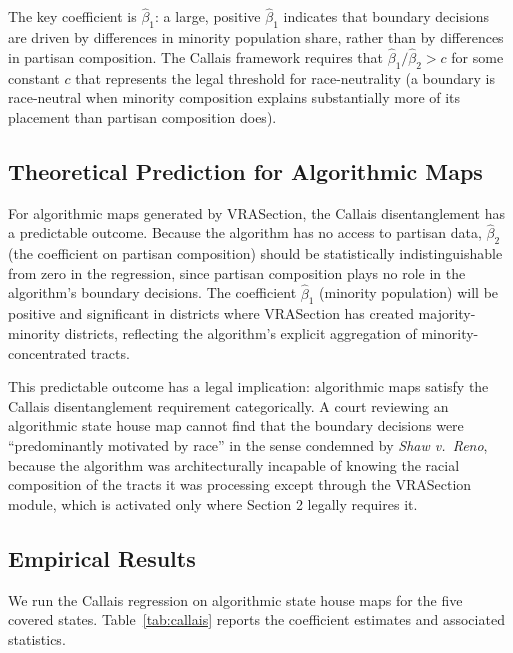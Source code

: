 The key coefficient is $\hat\beta_1$: a large, positive $\hat\beta_1$ indicates that boundary decisions are driven by differences in minority population share, rather than by differences in partisan composition. The Callais framework requires that $\hat\beta_1 / \hat\beta_2 > c$ for some constant $c$ that represents the legal threshold for race-neutrality (a boundary is race-neutral when minority composition explains substantially more of its placement than partisan composition does).

\subsection{Theoretical Prediction for Algorithmic Maps}

For algorithmic maps generated by VRASection, the Callais disentanglement has a predictable outcome. Because the algorithm has no access to partisan data, $\hat\beta_2$ (the coefficient on partisan composition) should be statistically indistinguishable from zero in the regression, since partisan composition plays no role in the algorithm's boundary decisions. The coefficient $\hat\beta_1$ (minority population) will be positive and significant in districts where VRASection has created majority-minority districts, reflecting the algorithm's explicit aggregation of minority-concentrated tracts.

This predictable outcome has a legal implication: algorithmic maps satisfy the Callais disentanglement requirement categorically. A court reviewing an algorithmic state house map cannot find that the boundary decisions were ``predominantly motivated by race'' in the sense condemned by \textit{Shaw v.\ Reno}, because the algorithm was architecturally incapable of knowing the racial composition of the tracts it was processing except through the VRASection module, which is activated only where Section 2 legally requires it.

\subsection{Empirical Results}

We run the Callais regression on algorithmic state house maps for the five covered states. Table~\ref{tab:callais} reports the coefficient estimates and associated statistics.

